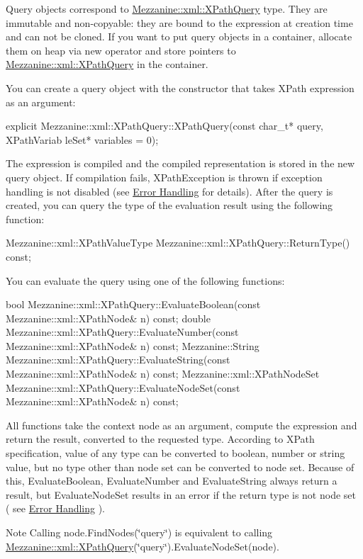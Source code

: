 Query objects correspond to \hyperlink{classMezzanine_1_1xml_1_1XPathQuery}{Mezzanine::xml::XPathQuery} type. They are immutable and non-\/copyable: they are bound to the expression at creation time and can not be cloned. If you want to put query objects in a container, allocate them on heap via new operator and store pointers to \hyperlink{classMezzanine_1_1xml_1_1XPathQuery}{Mezzanine::xml::XPathQuery} in the container. \par
 \par
 You can create a query object with the constructor that takes XPath expression as an argument: 
\begin{DoxyCode}
 explicit Mezzanine::xml::XPathQuery::XPathQuery(const char_t* query, XPathVariab
      leSet* variables = 0);
\end{DoxyCode}
 The expression is compiled and the compiled representation is stored in the new query object. If compilation fails, XPathException is thrown if exception handling is not disabled (see \hyperlink{XMLManual_XMLXPathError}{Error Handling} for details). After the query is created, you can query the type of the evaluation result using the following function: 
\begin{DoxyCode}
 Mezzanine::xml::XPathValueType Mezzanine::xml::XPathQuery::ReturnType() const;
\end{DoxyCode}
 You can evaluate the query using one of the following functions: 
\begin{DoxyCode}
 bool Mezzanine::xml::XPathQuery::EvaluateBoolean(const 
      Mezzanine::xml::XPathNode& n) const;
 double Mezzanine::xml::XPathQuery::EvaluateNumber(const 
      Mezzanine::xml::XPathNode& n) const;
 Mezzanine::String Mezzanine::xml::XPathQuery::EvaluateString(const 
      Mezzanine::xml::XPathNode& n) const;
 Mezzanine::xml::XPathNodeSet Mezzanine::xml::XPathQuery::EvaluateNodeSet(const 
      Mezzanine::xml::XPathNode& n) const;
\end{DoxyCode}
 All functions take the context node as an argument, compute the expression and return the result, converted to the requested type. According to XPath specification, value of any type can be converted to boolean, number or string value, but no type other than node set can be converted to node set. Because of this, EvaluateBoolean, EvaluateNumber and EvaluateString always return a result, but EvaluateNodeSet results in an error if the return type is not node set ( see \hyperlink{XMLManual_XMLXPathError}{Error Handling} ). \begin{DoxyNote}{Note}
Calling node.FindNodes(\char`\"{}query\char`\"{}) is equivalent to calling \hyperlink{classMezzanine_1_1xml_1_1XPathQuery}{Mezzanine::xml::XPathQuery}(\char`\"{}query\char`\"{}).EvaluateNodeSet(node).
\end{DoxyNote}
